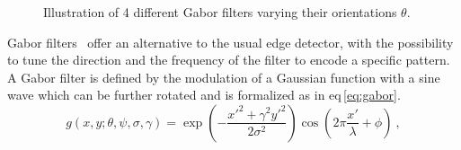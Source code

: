 \begin{figure}
	\hspace*{\fill}
		 \hfill
		 \hfill
		 \hfill
	\hspace*{\fill}
	\caption[Illustration of 4 different Gabor filters.]{Illustration of 4 different Gabor filters varying their orientations $\theta$.}
	\label{fig:gabor}
\end{figure}

Gabor filters~\cite{Gabor1946,Daugman1985} offer an alternative to the usual edge detector, with the possibility to tune the direction and the frequency of the filter to encode a specific pattern. 
A Gabor filter is defined by the modulation of a Gaussian function with a sine wave which can be further rotated and is formalized as in \acs{eq}\,\ref{eq:gabor}.
\begin{equation}
	g(x,y;\theta,\psi,\sigma,\gamma) = \exp \left( - \frac{x'^{2}+ \gamma^{2}y'^{2}}{2 \sigma^{2}} \right) \cos \left( 2 \pi \frac{x'}{\lambda} + \phi \right) \ ,
        \label{eq:gabor}
\end{equation}

